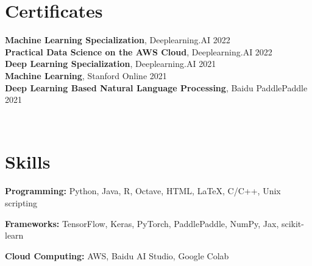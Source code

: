 \documentclass[letterpaper,11pt]{article}
\newcommand{\resumeSubHeadingListStart}{\begin{itemize}[leftmargin=0.15in, label={}]}
\newcommand{\resumeSubHeadingListEnd}{\end{itemize}}
\begin{document}
\section{Certificates}
  \resumeSubHeadingListStart
    \small{\item{
        \textbf{Machine Learning Specialization}, Deeplearning.AI \hfill 2022 \\ \vspace{1pt}
        \textbf{Practical Data Science on the AWS Cloud}, Deeplearning.AI \hfill 2022 \\ \vspace{1pt}
        \textbf{Deep Learning Specialization}, Deeplearning.AI \hfill 2021 \\ \vspace{1pt}
        \textbf{Machine Learning}, Stanford Online \hfill 2021 \\ \vspace{1pt}
        \textbf{Deep Learning Based Natural Language Processing}, Baidu PaddlePaddle \hfill 2021
    }} \\ \vspace{-5pt}
  \resumeSubHeadingListEnd



\section{Skills}
  \resumeSubHeadingListStart
    \small{\item{
        \textbf{Programming:}{ Python, Java, R, Octave, HTML, \LaTeX, C/C++, Unix scripting} \\ \vspace{2pt}
        
        \textbf{Frameworks:}{ TensorFlow, Keras, PyTorch, PaddlePaddle, NumPy, Jax, scikit-learn} \\ \vspace{2pt}
        
        \textbf{Cloud Computing:}{ AWS, Baidu AI Studio, Google Colab}
    }} \\ \vspace{-5pt}
  \resumeSubHeadingListEnd
 

\end{document}
